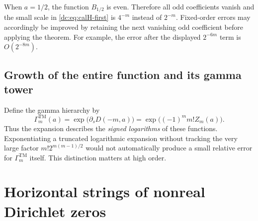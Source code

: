 \documentclass[11pt,a4paper,oneside,openany]{book}
\numberwithin{equation}{chapter}
\theoremstyle{definition}
\theoremstyle{remark}
\begin{document}
When $a=1/2$, the function $B_{1/2}$ is even. Therefore all odd
coefficients vanish and the small scale in \eqref{dc:eq:calH-first} is
$4^{-m}$ instead of $2^{-m}$. Fixed-order errors may accordingly be
improved by retaining the next vanishing odd coefficient before applying
the theorem. For example, the error after the displayed $2^{-6m}$ term is
$O(2^{-8m})$.

\section{Growth of the entire function and its gamma tower}
Define the gamma hierarchy by
\begin{equation}\label{ra:eq:Gammadef}
 \Gamma_m^{\mathrm{TM}}(a)
   =\exp\bigl(\partial_sD(-m,a)\bigr)
   =\exp\bigl((-1)^m m!Z_m(a)\bigr).
\end{equation}
Thus the expansion describes the \emph{signed logarithms} of these
functions. Exponentiating a truncated logarithmic expansion without
tracking the very large factor $m!2^{m(m-1)/2}$ would not automatically
produce a small relative error for $\Gamma_m^{\mathrm{TM}}$ itself.
This distinction matters at high order.
\chapter{Horizontal strings of nonreal Dirichlet zeros}
\label{dc:sec:zeros}
\end{document}
